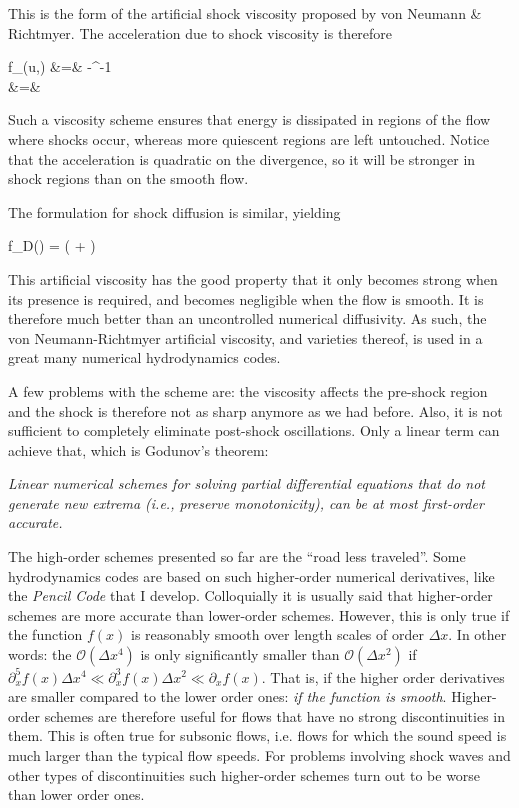 \beq
{}
\eeq

This is the form of the artificial shock viscosity proposed by von
Neumann \& Richtmyer. The acceleration due to shock viscosity is therefore

 \beqn
 f_\nu(u,\rho) &=& -\rho^{-1}\Div{\v{\pi}} \\
 &=&\zeta{}
 \eeqn

Such a viscosity scheme ensures that energy is dissipated in regions
of the flow where shocks occur, whereas more quiescent regions are
left untouched. Notice that the acceleration is quadratic on the
divergence, so it will be stronger in shock regions than on the smooth
flow. 

The formulation for shock diﬀusion is similar, yielding

\beq
 f_D(\rho) = \zeta\left(\Laplace{\rho} + \grad{\ln\zeta}\cdot\grad{\rho}\right)
\eeq

This artificial viscosity has the good property that it only becomes
strong when its presence is required, and becomes negligible when the
flow is smooth. It is therefore much better than an uncontrolled
numerical diffusivity. As such, the von Neumann-Richtmyer artificial
viscosity, and varieties thereof, is used in a great many numerical hydrodynamics codes.

A few problems with the scheme are: the viscosity
affects the pre-shock region and the shock is therefore not as sharp
anymore as we had before. Also, it is not sufficient to completely
eliminate post-shock oscillations. Only a linear term can achieve
that, which is Godunov's theorem: 

{\it Linear numerical schemes for solving partial differential equations that do not generate
new extrema (i.e., preserve monotonicity), can be at most first-order accurate.}



The high-order schemes presented so far are the ``road less
traveled''.  Some hydrodynamics codes are based on such higher-order
numerical derivatives, like the {\it Pencil Code} that I
develop. Colloquially it is usually said that higher-order
schemes are more accurate than lower-order schemes.
However, this is only true if the function $f(x)$ is reasonably
smooth over length scales of order $\Delta x$.
In other words: the ${\mathcal O}(\Delta x^4)$ is only significantly
smaller than ${\mathcal O}(\Delta x^2)$ if $\partial^5_xf(x)\Delta x^4
\ll \partial^3_xf(x)\Delta x^2 \ll \partial_x f(x)$. That is, if the
higher order derivatives are smaller compared to the lower order
ones: {\it if the function is smooth}.
Higher-order schemes are therefore useful for flows that have no strong
discontinuities in them. This is often true for subsonic flows,
i.e. flows for which the sound speed is much larger than the typical
flow speeds. For problems involving shock waves and other types of
discontinuities such higher-order schemes turn out to be worse than
lower order ones. 

